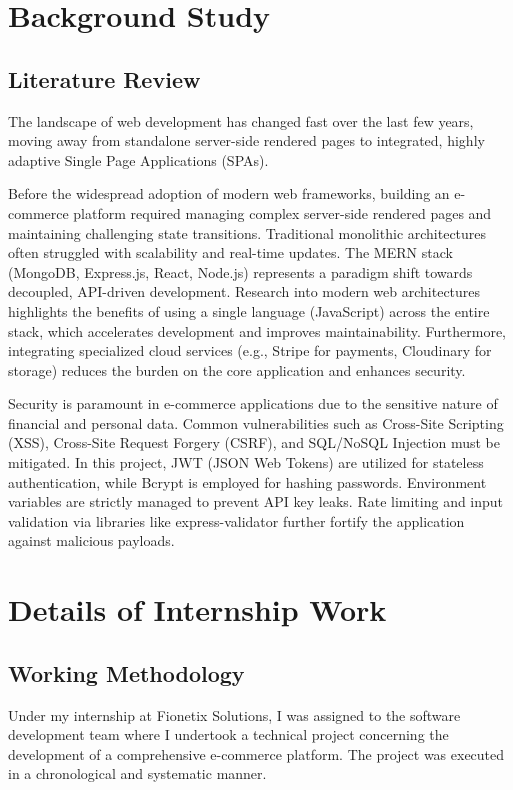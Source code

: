 \documentclass[12pt,a4paper]{report}
\begin{document}
\chapter{Background Study}
\section{Literature Review}
The landscape of web development has changed fast over the last few years, moving away from standalone server-side rendered pages to integrated, highly adaptive Single Page Applications (SPAs).

Before the widespread adoption of modern web frameworks, building an e-commerce platform required managing complex server-side rendered pages and maintaining challenging state transitions. Traditional monolithic architectures often struggled with scalability and real-time updates. The MERN stack (MongoDB, Express.js, React, Node.js) represents a paradigm shift towards decoupled, API-driven development. Research into modern web architectures highlights the benefits of using a single language (JavaScript) across the entire stack, which accelerates development and improves maintainability. Furthermore, integrating specialized cloud services (e.g., Stripe for payments, Cloudinary for storage) reduces the burden on the core application and enhances security.

Security is paramount in e-commerce applications due to the sensitive nature of financial and personal data. Common vulnerabilities such as Cross-Site Scripting (XSS), Cross-Site Request Forgery (CSRF), and SQL/NoSQL Injection must be mitigated. In this project, JWT (JSON Web Tokens) are utilized for stateless authentication, while Bcrypt is employed for hashing passwords. Environment variables are strictly managed to prevent API key leaks. Rate limiting and input validation via libraries like express-validator further fortify the application against malicious payloads.


\chapter{Details of Internship Work}
\section{Working Methodology}
Under my internship at Fionetix Solutions, I was assigned to the software development team where I undertook a technical project concerning the development of a comprehensive e-commerce platform. The project was executed in a chronological and systematic manner.
\end{document}
